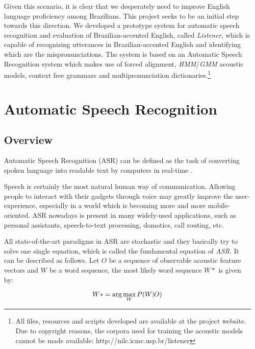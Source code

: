 \documentclass[twocolumn]{bmcart}%
\begin{document}
Given this scenario, it is clear that we desperately need to improve English language proficiency among Brazilians. This project seeks to be an initial step towards this direction. We developed a prototype system for automatic speech recognition and evaluation of Brazilian-accented English, called \emph{Listener}, which is capable of recognizing utterances in Brazilian-accented English and identifying which are the mispronunciations. The system is based on an Automatic Speech Recognition system which makes use of forced alignment, \emph{HMM}/\emph{GMM} acoustic models, context free grammars and multipronunciation dictionaries.\footnote{All files, resources and scripts developed are available at the project website. Due to copyright reasons, the corpora used for training the acoustic models cannot be made available: http://nilc.icmc.usp.br/listener}

\section*{Automatic Speech Recognition}\label{sec:speech-recognition}
\subsection*{\textbf{Overview}}

Automatic Speech Recognition (ASR) can be defined as the task of converting spoken language into readable text by computers in real-time \cite{Huang2001}. 

Speech is certainly the most natural human way of communication. Allowing people to interact with their gadgets through voice may greatly improve the user-experience, especially in a world which is becoming more and more mobile-oriented.  ASR nowadays is present in many widely-used applications, such as personal assistants, speech-to-text processing, domotics, call routing, etc.

All state-of-the-art paradigms in ASR are stochastic and they basically try to solve one single equation, which is called the fundamental equation of \emph{ASR}. It can be described as follows. Let $O$ be a sequence of observable acoustic feature vectors and $W$ be a word sequence, the most likely word sequence $W*$ is given by:

\begin{equation}{\label{eq:fund-asr}}
W*= \arg\max_{W}P(W|O)
\end{equation}
\end{document}

